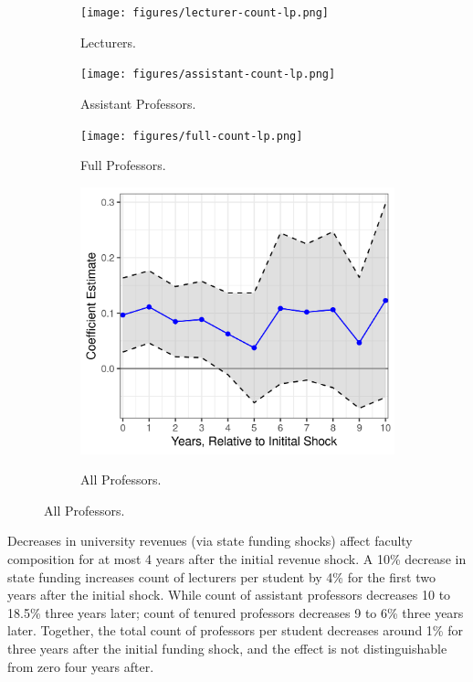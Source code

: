 \begin{figure}[h!]
    \centering
    \singlespacing
    \caption{Local Projection Estimates for Professor Count per Student, by Professor Group.}
    \begin{subfigure}[b]{0.495\textwidth}
        \centering
        \caption{Lecturers.}
        \texttt{[image: figures/lecturer-count-lp.png]}
        \label{fig:lecturer-count-lp}
    \end{subfigure}
    \begin{subfigure}[b]{0.495\textwidth}
        \centering
        \caption{Assistant Professors.}
        \texttt{[image: figures/assistant-count-lp.png]}
        \label{fig:assistant-count-lp}
    \end{subfigure}
    \begin{subfigure}[b]{0.495\textwidth}
        \centering
        \caption{Full Professors.}
        \texttt{[image: figures/full-count-lp.png]}
        \label{fig:full-count-lp}
    \end{subfigure}
    \begin{subfigure}[b]{0.495\textwidth}
        \centering
        \caption{All Professors.}
        \includegraphics[width=\textwidth]{figures/all-count-lp.png}
        \label{fig:all-count-lp}
    \end{subfigure}
    \label{fig:count-lp}
\end{figure}

Decreases in university revenues (via state funding shocks) affect faculty composition for at most 4 years after the initial revenue shock.
A 10\% decrease in state funding increases count of lecturers per student by 4\% for the first two years after the initial shock.
While count of assistant professors decreases 10 to 18.5\% three years later;
count of tenured professors decreases 9 to 6\% three years later.
Together, the total count of professors per student decreases around 1\% for three years after the initial funding shock, and the effect is not distinguishable from zero four years after.

